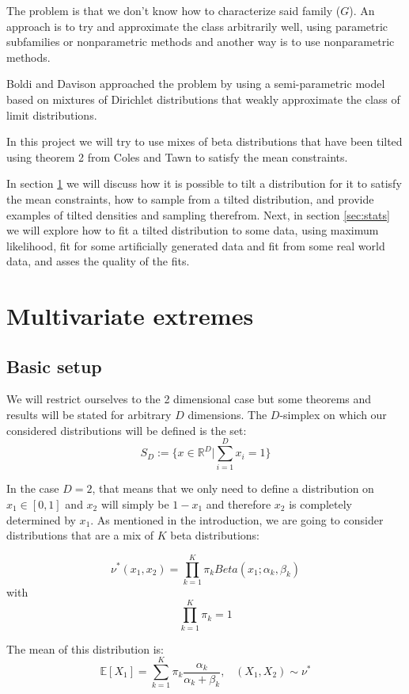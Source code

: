 \documentclass[10pt]{report}
\begin{document}
The problem is that we don't know how to characterize said family ($G$). An approach is to try and approximate the class arbitrarily well, using parametric subfamilies or nonparametric methods and another way is to use nonparametric methods.

Boldi and Davison \cite{BoldiDavison} approached the problem by using a semi-parametric model based on mixtures of Dirichlet distributions that weakly approximate the class of limit distributions.

In this project we will try to use mixes of beta distributions that have been tilted using theorem 2 from Coles and Tawn \cite{ColesTawn} to satisfy the mean constraints.

In section \ref{sec:multivariate} we will discuss how it is possible to tilt a distribution for it to satisfy the mean constraints, how to sample from a tilted distribution, and provide examples of tilted densities and sampling therefrom. 
Next, in section \ref{sec:stats} we will explore how to fit a tilted distribution to some data, using maximum likelihood, fit for some artificially generated data and fit from some real world data, and asses the quality of the fits.

\chapter{Multivariate extremes}
\label{sec:multivariate}
\section{Basic setup}

We will restrict ourselves to the 2 dimensional case but some theorems and results will be stated for arbitrary $D$ dimensions. The $D$-simplex on which our considered distributions will be defined is the set: 
$$
S_D :=\{x \in \mathbb{R}^D | \sum_{i=1}^D x_i = 1\}
$$

In the case $D=2$, that means that we only need to define a distribution on $ x_1 \in [0,1]$ and $x_2$ will simply be $1-x_1$ and therefore $x_2$ is completely determined by $x_1$. As mentioned in the introduction, we are going to consider distributions that are a mix of $K$ beta distributions:

$$
\nu^*(x_1,x_2) = \prod_{k=1}^K \pi_k Beta(x_1;\alpha_k,\beta_k)
$$
with
$$
\prod_{k=1}^K \pi_k= 1
$$

The mean of this distribution is:
$$
\mathbb{E}[X_1] = \sum_{k=1}^K \pi_k\frac{\alpha_k}{\alpha_k + \beta_k}, \hspace{10pt} (X_1,X_2) \sim \nu^*
$$
\end{document}
